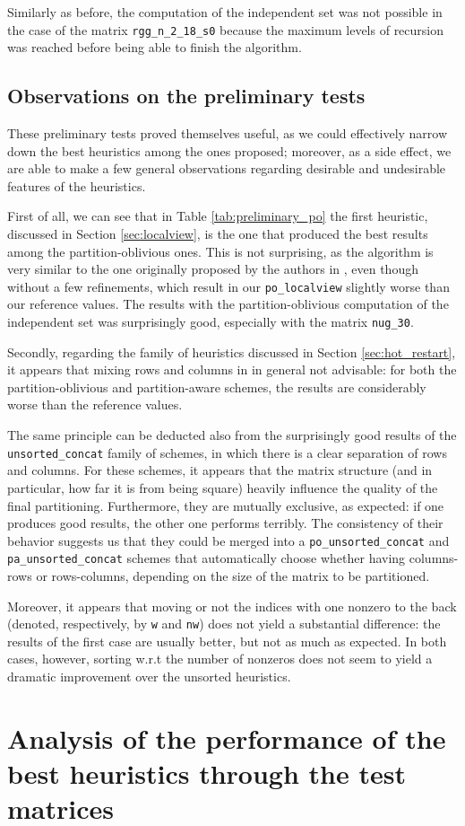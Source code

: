 Similarly as before, the computation of the independent set was not possible in the case of the matrix \verb|rgg_n_2_18_s0| because the maximum levels of recursion was reached before being able to finish the algorithm.

\subsection{Observations on the preliminary tests}

These preliminary tests proved themselves useful, as we could effectively narrow down the best heuristics among the ones proposed; moreover, as a side effect, we are able to make a few general observations regarding desirable and undesirable features of the heuristics.

First of all, we can see that in Table \ref{tab:preliminary_po} the first heuristic, discussed in Section \ref{sec:localview}, is the one that produced the best results among the partition-oblivious ones. This is not surprising, as the algorithm is very similar to the one originally proposed by the authors in \cite{mediumgrain}, even though without a few refinements, which result in our \verb|po_localview| slightly worse than our reference values. The results with the partition-oblivious computation of the independent set was surprisingly good, especially with the matrix \verb|nug_30|.

Secondly, regarding the family of heuristics discussed in Section \ref{sec:hot_restart}, it appears that mixing rows and columns in in general not advisable: for both the partition-oblivious and partition-aware schemes, the results are considerably worse than the reference values. 

The same principle can be deducted also from the surprisingly good results of the \verb|unsorted_concat| family of schemes, in which there is a clear separation of rows and columns. For these schemes, it appears that the matrix structure (and in particular, how far it is from being square) heavily influence the quality of the final partitioning. Furthermore, they are mutually exclusive, as expected: if one produces good results, the other one performs terribly. The consistency of their behavior suggests us that they could be merged into a \verb|po_unsorted_concat| and \verb|pa_unsorted_concat| schemes that automatically choose whether having columns-rows or rows-columns, depending on the size of the matrix to be partitioned.

Moreover, it appears that moving or not the indices with one nonzero to the back (denoted, respectively, by \verb|w| and \verb|nw|) does not yield a substantial difference: the results of the first case are usually better, but not as much as expected. In both cases, however, sorting w.r.t the number of nonzeros does not seem to yield a dramatic improvement over the unsorted heuristics.

\section{Analysis of the performance of the best heuristics through the test matrices}



